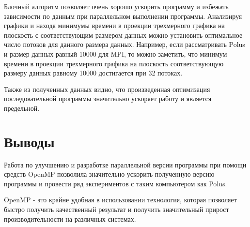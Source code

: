 \documentclass{article}
\begin{document}
Блочный алгоритм позволяет очень хорошо ускорить программу и избежать
зависимости по данным при параллельном выполнении программы.
Анализируя графики и находя минимумы времени в проекции трехмерного
графика на плоскость с соответствующим размером данных можно установить
оптимальное число потоков для данного размера данных. Например, если
рассматривать Polus и размер данных равный 10000 для MPI, то можно заметить, что минимум времени в проекции трехмерного графика на плоскость соответствующую размеру данных равному 10000 достигается при 32 потоках.

Также из полученных данных видно, что произведенная оптимизация
последовательной программы значительно ускоряет работу и является предельной.

\section{Выводы}
Работа по улучшению и разработке параллельной версии программы при
помощи средств OpenMP позволила значительно ускорить полученную версию
программы и провести ряд экспериментов с таким компьютером как Polus.

OpenMP - это крайне удобная в использовании технология, которая позволяет
быстро получить качественный результат и получить значительный прирост
производительности на различных системах.
\end{document}
